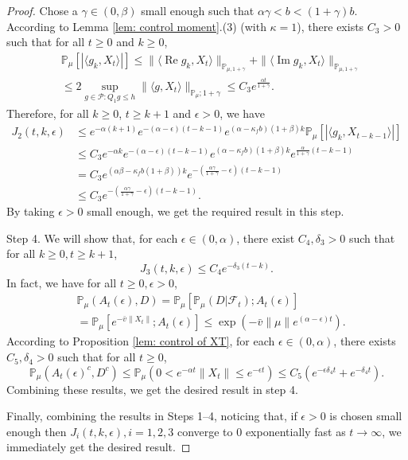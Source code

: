 \documentclass[12pt,a4paper]{amsart}
\theoremstyle{plain}
\theoremstyle{definition}
\numberwithin{equation}{section}
\begin{document}
\begin{proof}
    Chose a $\gamma\in(0,\beta)$ small enough such that $\alpha \gamma < b < (1+\gamma)b$.
    According to Lemma \ref{lem: control moment}.(3) (with $\kappa=1$), there exists $C_3>0$ such that for all $t\geq 0$ and $k\geq 0$,
\begin{align}
    &\mathbb{P}_{\mu}\left[\left|\langle g_k,X_{t}\rangle\right|\right]
    \leq \|\langle \operatorname{Re} g_k, X_{t}\rangle\|_{\mathbb{P}_{\mu,1+\gamma}} + \|\langle \operatorname{Im} g_k, X_{t}\rangle\|_{\mathbb{P}_{\mu,1+\gamma}}
    \\& \leq 2\sup_{g\in \mathcal P: Q_1 g\leq h} \|\langle g, X_t\rangle\|_{\mathbb P_\mu; 1+\gamma} \leq C_3 e^{\frac{\alpha t}{1+\gamma}}.
\end{align}
    Therefore, for all $k\geq 0$, $t\geq k+1$ and $\epsilon> 0$, we have
\begin{align}
\label{eq: right bound for J2}
    J_2(t,k, \epsilon)&
    \leq  e^{-\alpha (k+1)}e^{-(\alpha-\epsilon)(t-k-1)}e^{(\alpha-\kappa_f b)(1+\beta)k} \mathbb{P}_{\mu}\left[\left|\langle g_k,X_{t-k-1}\rangle\right|\right]
    \\&\leq C_3 e^{-\alpha k}e^{-(\alpha-\epsilon)(t-k-1)}e^{(\alpha-\kappa_f b)(1+\beta)k} e^{\frac{\alpha}{1+\gamma}(t-k-1)}
    \\&= C_3 e^{(\alpha \beta - \kappa_f b(1+\beta))k}e^{-(\frac{\alpha\gamma}{1+\gamma}-\epsilon)(t-k-1)}
    \\&\leq C_3 e^{-(\frac{\alpha\gamma}{1+\gamma}-\epsilon)(t-k-1)}.
\end{align}
    By taking $\epsilon >0$ small enough, we get the required result in this step.

    Step 4.
    We will show that, for each $\epsilon\in (0,  \alpha)$, there exist $C_4,\delta_3>0$ such that for all $k\geq0, t\geq k+1$,
\begin{equation}\label{ineq: control of J3}
    J_3(t,k,\epsilon)\leq C_4e^{-\delta_3 (t-k)}.
\end{equation}
    In fact, we have  for all $t\geq 0, \epsilon >0$,
\begin{align}
    &\mathbb P_{\mu}(A_{t}(\epsilon), D) = \mathbb P_{\mu}[\mathbb P_{\mu}(D|\mathscr F_t);A_t(\epsilon)]
    \\&= \mathbb P_\mu[e^{-\bar v\|X_t\|};A_t(\epsilon)]
    \leq \exp({-\bar v \|\mu\|e^{(\alpha - \epsilon)t}}).
\end{align}
    According to Proposition \ref{lem: control of XT}, for each $\epsilon \in (0, \alpha)$, there exists  $C_5, \delta_4>0$ such that for all $t\geq 0$,
\begin{equation}
    \mathbb P_\mu(A_t(\epsilon)^c,D^c) \leq   \mathbb P_\mu(0 < e^{-\alpha t}\|X_t\|\leq e^{ - \epsilon t}) \leq C_5 (e^{-\epsilon \delta_4 t}+e^{-\delta_4 t}).
\end{equation}
    Combining these results, we get the desired result in step 4.

    Finally, combining the results in Steps 1--4, noticing that, if $\epsilon>0$ is chosen small enough then $J_{i}(t,k,\epsilon), i = 1,2,3$ converge to $0$ exponentially fast as $t\rightarrow\infty$, we immediately get the desired result.
\end{proof}
\end{document}
